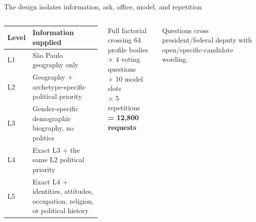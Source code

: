 \documentclass[aspectratio=169,11pt]{beamer}
\newcommand{\sourceNote}[1]{\par\vspace{0.25em}\begingroup\raggedright\color{Grey}\scriptsize #1\par\endgroup}
\begin{document}
\begin{frame}{The design isolates information, ask, office, model, and repetition}
  \begin{columns}[T,onlytextwidth]
    \begin{tabularx}{\linewidth}{@{}lX@{}}
      \toprule
      \textbf{Level} & \textbf{Information supplied} \\
      \midrule
      L1 & São Paulo geography only \\
      L2 & Geography + archetype-specific political priority \\
      L3 & Gender-specific demographic biography, no politics \\
      L4 & Exact L3 + the same L2 political priority \\
      L5 & Exact L4 + identities, attitudes, occupation, religion, or political history \\
      \bottomrule
    \end{tabularx}
    \begin{block}{Full factorial crossing}
      64 profile bodies\\
      $\times$ 4 voting questions\\
      $\times$ 10 model slots\\
      $\times$ 5 repetitions\\[0.5em]
      {\bfseries = 12,800 requests}
    \end{block}
    \sourceNote{Questions cross president/federal deputy with open/specific-candidate wording.}
  \end{columns}
\end{frame}
\end{document}
